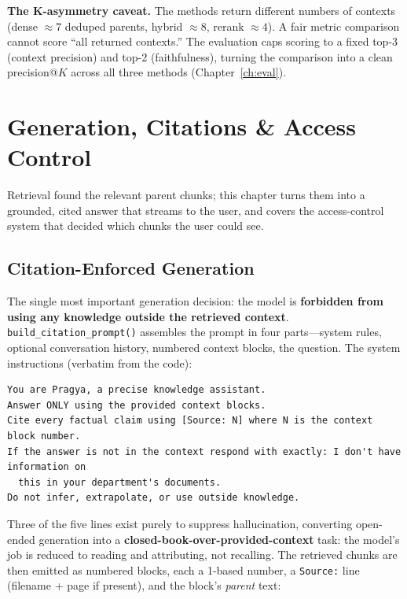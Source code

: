 \documentclass[11pt,a4paper,oneside]{report}
\newcommand{\code}[1]{\texttt{#1}}
\begin{document}
\begin{keyidea}
\textbf{The K-asymmetry caveat.} The methods return different numbers of contexts (dense $\approx 7$
deduped parents, hybrid $\approx 8$, rerank $\approx 4$). A fair metric comparison cannot score ``all
returned contexts.'' The evaluation caps scoring to a fixed top-3 (context precision) and top-2
(faithfulness), turning the comparison into a clean precision@$K$ across all three methods
(Chapter~\ref{ch:eval}).
\end{keyidea}

\chapter{Generation, Citations \& Access Control}
\label{ch:generation}

Retrieval found the relevant parent chunks; this chapter turns them into a grounded, cited answer
that streams to the user, and covers the access-control system that decided which chunks the user
could see.

\section{Citation-Enforced Generation}
The single most important generation decision: the model is \textbf{forbidden from using any
knowledge outside the retrieved context}. \code{build\_citation\_prompt()} assembles the prompt in
four parts---system rules, optional conversation history, numbered context blocks, the question. The
system instructions (verbatim from the code):

\begin{lstlisting}[language=none,caption={The five-line system contract (generation\_service.py).}]
You are Pragya, a precise knowledge assistant.
Answer ONLY using the provided context blocks.
Cite every factual claim using [Source: N] where N is the context block number.
If the answer is not in the context respond with exactly: I don't have information on
  this in your department's documents.
Do not infer, extrapolate, or use outside knowledge.
\end{lstlisting}

Three of the five lines exist purely to suppress hallucination, converting open-ended generation into
a \textbf{closed-book-over-provided-context} task: the model's job is reduced to reading and
attributing, not recalling. The retrieved chunks are then emitted as numbered blocks, each a 1-based
number, a \code{Source:} line (filename + page if present), and the block's \emph{parent} text:
\end{document}
